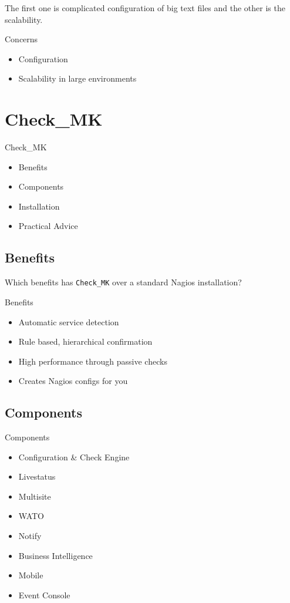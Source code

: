 The first one is complicated configuration of big text files
and the other is the scalability.

\begin{frame}{Concerns}

\begin{itemize}
\item Configuration
\item Scalability in large environments
\end{itemize}
\end{frame}

\section{Check\_MK}

\begin{frame}[fragile]{Check\_MK}
\begin{itemize}
\item Benefits
\item Components
\item Installation
\item Practical Advice
\end{itemize}
\end{frame}

\subsection{Benefits}

Which benefits has \verb|Check_MK| over a standard Nagios installation?

\begin{frame}[fragile]{Benefits}
\begin{itemize}
\item Automatic service detection
\item Rule based, hierarchical confirmation
\item High performance through passive checks
\item Creates Nagios configs for you
\end{itemize}
\end{frame}

\subsection{Components}
\begin{frame}[fragile]{Components}
\begin{itemize}
\item Configuration \& Check Engine
\item Livestatus
\item Multisite
\item WATO
\item Notify
\item Business Intelligence
\item Mobile
\item Event Console
\end{itemize}
\end{frame}


